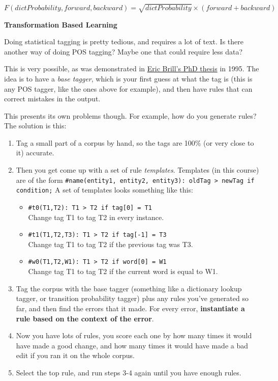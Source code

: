 \begin{description}
  \[
    F(dictProbability, forward, backward) = \sqrt{dictProbability} \times 
      (forward + backward)
  \]

  \item \textbf{Transformation Based Learning}\\


  Doing statistical tagging is pretty tedious, and requires a lot of text. Is
  there another way of doing POS tagging? Maybe one that could require less
  data?

  This is very possible, as was demonstrated in
  \href{http://dl.acm.org/citation.cfm?doid=974499.974526}{Eric Brill's PhD
  thesis} in 1995. The idea is to have a \textit{base tagger}, which is your 
  first guess at what the tag is (this is any POS tagger, like the ones above 
  for example), and then have rules that can correct mistakes in the output.

  This presents its own problems though. For example, how do you generate 
  rules? The solution is this:

  \begin{enumerate}
    \item Tag a small part of a corpus by hand, so the tags are 100\% (or very 
    close to it) accurate.
    \item Then you get come up with a set of rule \textit{templates}. Templates 
    (in this course) are of the form
    \texttt{\#name(entity1, entity2, entity3): oldTag > newTag if condition;} A 
    set of templates looks something like this:
    \begin{itemize}
      \item \texttt{\#t0(T1,T2): T1 > T2 if tag[0] = T1}\\
        Change tag T1 to tag T2 in every instance.
      \item \texttt{\#t1(T1,T2,T3): T1 > T2 if tag[-1] = T3}\\
        Change tag T1 to tag T2 if the previous tag was T3.
      \item \texttt{\#w0(T1,T2,W1): T1 > T2 if word[0] = W1}\\
        Change tag T1 to tag T2 if the current word is equal to W1.
    \end{itemize}
    \item Tag the corpus with the base tagger (something like a dictionary 
    lookup tagger, or transition probability tagger) plus any rules you've 
    generated so far, and then find the errors that it made. For every error,
    \textbf{instantiate a rule based on the context of the error}.
    \item Now you have lots of rules, you score each one by how many times it 
    would have made a good change, and how many times it would have made a bad 
    edit if you ran it on the whole corpus.
    \item Select the top rule, and run steps 3-4 again until you have enough 
    rules.
  \end{enumerate}


\end{description}
